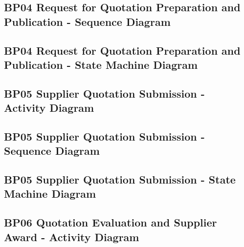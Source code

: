 \documentclass[conference]{IEEEtran}
\begin{document}
\subsection*{BP04 Request for Quotation Preparation and Publication - Sequence Diagram}



\subsection*{BP04 Request for Quotation Preparation and Publication - State Machine Diagram}



\subsection*{BP05 Supplier Quotation Submission - Activity Diagram}



\subsection*{BP05 Supplier Quotation Submission - Sequence Diagram}



\subsection*{BP05 Supplier Quotation Submission - State Machine Diagram}



\subsection*{BP06 Quotation Evaluation and Supplier Award - Activity Diagram}

\end{document}

